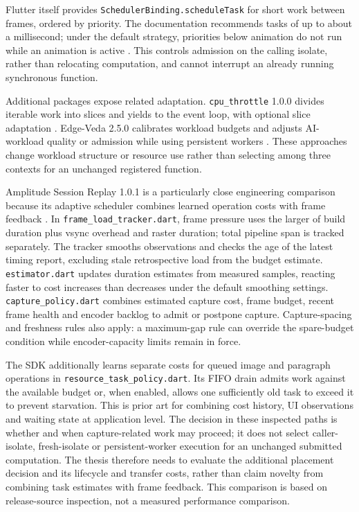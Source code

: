 \documentclass[14pt,a4paper,oneside]{extreport}
\begin{document}
Flutter itself provides \texttt{SchedulerBinding.scheduleTask} for short work between frames,
ordered by priority. The documentation recommends tasks of up to about a millisecond; under
the default strategy, priorities below animation do not run while an animation is active
\citep{flutter-schedule-task}. This controls admission on the calling isolate, rather than
relocating computation, and cannot interrupt an already running synchronous function.

Additional packages expose related adaptation. \texttt{cpu\_throttle} 1.0.0 divides iterable
work into slices and yields to the event loop, with optional slice adaptation
\citep{cpu-throttle}. Edge-Veda 2.5.0 calibrates workload budgets and adjusts AI-workload
quality or admission while using persistent workers \citep{edge-veda}. These approaches change
workload structure or resource use rather than selecting among three contexts for an unchanged
registered function.

Amplitude Session Replay 1.0.1 is a particularly close engineering comparison because its
adaptive scheduler combines learned operation costs with frame feedback
\citep{amplitude-replay}. In \texttt{frame\_load\_tracker.dart}, frame pressure uses the
larger of build duration plus vsync overhead and raster duration; total pipeline span is
tracked separately. The tracker smooths observations and checks the age of the latest timing
report, excluding stale retrospective load from the budget estimate. \texttt{estimator.dart}
updates duration estimates from measured samples, reacting faster to cost increases than
decreases under the default smoothing settings. \texttt{capture\_policy.dart} combines
estimated capture cost, frame budget, recent frame health and encoder backlog to admit or
postpone capture. Capture-spacing and freshness rules also apply: a maximum-gap rule can
override the spare-budget condition while encoder-capacity limits remain in force.

The SDK additionally learns separate costs for queued image and paragraph operations in
\texttt{resource\_task\_policy.dart}. Its FIFO drain admits work against the available budget
or, when enabled, allows one sufficiently old task to exceed it to prevent starvation. This is
prior art for combining cost history, UI observations and waiting state at application level.
The decision in these inspected paths is whether and when capture-related work may proceed; it
does not select caller-isolate, fresh-isolate or persistent-worker execution for an unchanged
submitted computation. The thesis therefore needs to evaluate the additional placement
decision and its lifecycle and transfer costs, rather than claim novelty from combining task
estimates with frame feedback. This comparison is based on release-source inspection, not a
measured performance comparison.
\end{document}
